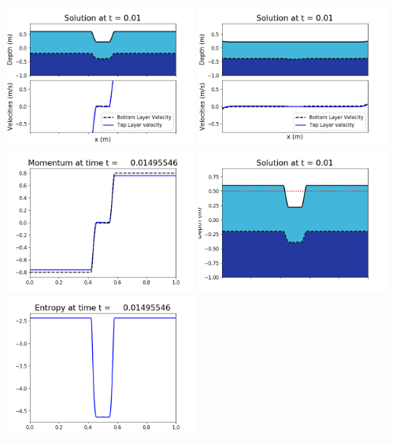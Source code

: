 \documentclass[11pt]{article}
\begin{document}
\vskip 10pt 
\includegraphics[width=0.475\textwidth]{frame0042fig1001.png}
\includegraphics[width=0.475\textwidth]{frame0042fig1002.png}
\vskip 10pt 
\includegraphics[width=0.475\textwidth]{frame0042fig1003.png}
\includegraphics[width=0.475\textwidth]{frame0042fig1006.png}
\vskip 10pt 
\includegraphics[width=0.475\textwidth]{frame0042fig1007.png}
\end{document}
